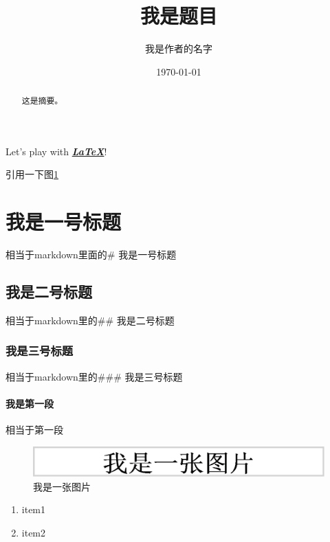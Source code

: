 ﻿%
\title{我是题目}
\author{我是作者的名字}
\date{\today}%




\tableofcontents
\newpage

\listoffigures

\newpage%


\begin{abstract}
这是摘要。
\end{abstract}





Let's play with \textbf{\emph{\underline{\LaTeX}}}!\cite{1}

引用一下图\ref{figure:1}
\section{我是一号标题}
相当于markdown里面的\# 我是一号标题
\subsection{我是二号标题}
相当于markdown里的\#\# 我是二号标题
\subsubsection{我是三号标题}
相当于markdown里的\#\#\# 我是三号标题
\paragraph{我是第一段}
相当于第一段
\begin{figure}[H]%
\centering%
\includegraphics[width = .8\textwidth]{pic.png}%
\caption{我是一张图片}%
\label{figure:1}%
\end{figure}

\begin{enumerate}
\item item1
\item item2
\end{enumerate}

